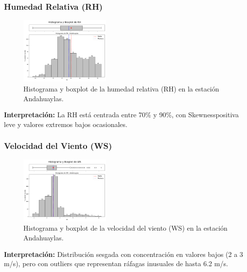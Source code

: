 \subsubsection*{Humedad Relativa (RH)}
\begin{figure}[H]
\centering
\includegraphics[width=0.4\textwidth]{resultados/por_estacion_meteorologica/Andahuaylas/RH_histograma.png}
\caption{Histograma y boxplot de la humedad relativa (RH) en la estación Andahuaylas.}
\label{fig:andahuaylas_RH}
\end{figure}
\textbf{Interpretación:} La RH está centrada entre 70\% y 90\%, con Skewnesspositiva leve y valores extremos bajos ocasionales.

\subsubsection*{Velocidad del Viento (WS)}
\begin{figure}[H]
\centering
\includegraphics[width=0.4\textwidth]{resultados/por_estacion_meteorologica/Andahuaylas/WS_histograma.png}
\caption{Histograma y boxplot de la velocidad del viento (WS) en la estación Andahuaylas.}
\label{fig:andahuaylas_WS}
\end{figure}
\textbf{Interpretación:} Distribución sesgada con concentración en valores bajos (2 a 3 m/s), pero con outliers que representan ráfagas inusuales de hasta 6.2 m/s.

